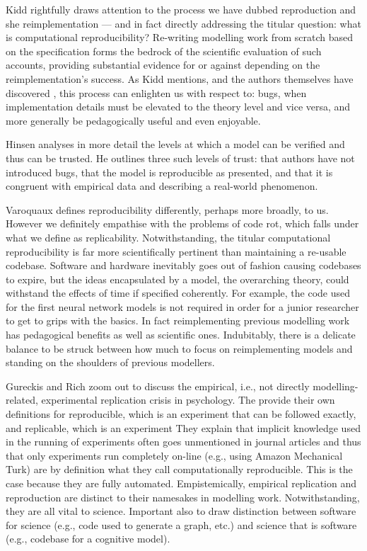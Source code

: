 \documentclass[jou]{apa6}
\begin{document}
Kidd rightfully draws attention to the process we have dubbed reproduction and she reimplementation --- and in fact directly addressing the titular question: what is computational reproducibility? Re-writing modelling work from scratch based on the specification forms the bedrock of the scientific evaluation of such accounts, providing substantial evidence for or against depending on the reimplementation's success. As Kidd mentions, and the authors themselves have discovered \cite{cooper14}, this process can enlighten us with respect to: bugs, when implementation details must be elevated to the theory level and vice versa, and more generally be pedagogically useful and even enjoyable.

Hinsen analyses in more detail the levels at which a model can be verified and thus can be trusted. He outlines three such levels of trust: that authors have not introduced bugs, that the model is reproducible as presented, and that it is congruent with empirical data and describing a real-world phenomenon.

Varoquaux defines reproducibility differently, perhaps more broadly, to us. However we definitely empathise with the problems of code rot, which falls under what we define as replicability. Notwithstanding, the titular computational reproducibility is far more scientifically pertinent than maintaining a re-usable codebase. Software and hardware inevitably goes out of fashion causing codebases to expire, but the ideas encapsulated by a model, the overarching theory, could withstand the effects of time if specified coherently. For example, the code used for the first neural network models is not required in order for a junior researcher to get to grips with the basics. In fact reimplementing previous modelling work has pedagogical benefits as well as scientific ones. Indubitably, there is a delicate balance to be struck between how much to focus on reimplementing models and standing on the shoulders of previous modellers. 

Gureckis and Rich zoom out to discuss the empirical, i.e., not directly modelling-related, experimental replication crisis in psychology. The provide their own definitions for reproducible, which is an experiment that can be followed exactly, and replicable, which is an experiment They explain that implicit knowledge used in the running of experiments often goes unmentioned in journal articles and thus that only experiments run completely on-line (e.g., using Amazon Mechanical Turk) are by definition what they call computationally reproducible. This is the case because they are fully automated. Empistemically, empirical replication and reproduction are distinct to their namesakes in modelling work. Notwithstanding, they are all vital to science. Important also to draw distinction between software for science (e.g., code used to generate a graph, etc.) and science that is software (e.g., codebase for a cognitive model). 
\end{document}
